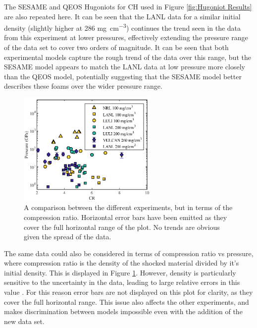 The SESAME and QEOS Hugoniots for CH used in Figure \ref{fig:Hugoniot Results} are also repeated here. It can be seen that the LANL data for a similar initial density (slightly higher at 286 \unit{\milli\gram\per\centi\meter\cubed}) continues the trend seen in the data from this experiment at lower pressures, effectively extending the pressure range of the data set to cover two orders of magnitude. It can be seen that both experimental models capture the rough trend of the data over this range, but the SESAME model appears to match the LANL data at low pressure more closely than the QEOS model, potentially suggesting that the SESAME model better describes these foams over the wider pressure range.

\begin{figure} [h!]
\begin{centering}
\includegraphics[width=0.6\textwidth]{figures/Experiment/OtherDataCR.eps}%
\caption{\label{fig:Other Foam Data CR} A comparison between the different experiments, but in terms of the compression ratio. Horizontal error bars have been emitted as they cover the full horizontal range of the plot. No trends are obvious given the spread of the data. }
\end{centering}
\end{figure}

The same data could also be considered in terms of compression ratio vs pressure, where compression ratio is the density of the shocked material divided by it's initial density. This is displayed in Figure \ref{fig:Other Foam Data CR}. However, density is particularly sensitive to the uncertainty in the data, leading to large relative errors in this value \cite{LePape2008}. For this reason error bars are not displayed on this plot for clarity, as they cover the full horizontal range. This issue also affects the other experiments, and makes discrimination between models impossible even with the addition of the new data set.











